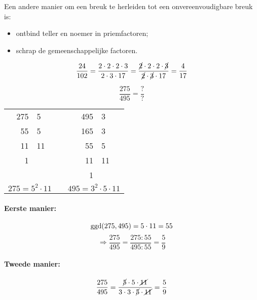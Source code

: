 \documentclass[12pt]{article}
\begin{document}
Een andere manier om een breuk te herleiden tot een onvereenvoudigbare breuk is:
\begin{itemize}
  \item ontbind teller en noemer in priemfactoren;
  \item schrap de gemeenschappelijke factoren.
\end{itemize}

\begin{voorbeeld}
$$\dfrac{24}{102}=\dfrac{2\cdot 2\cdot 2\cdot 3}{2\cdot 3 \cdot 17}=\dfrac{\cancel{2}\cdot 2\cdot 2\cdot \cancel{3}}{\cancel{2}\cdot \cancel{3} \cdot 17}=\dfrac{4}{17}$$
\end{voorbeeld}

\begin{voorbeeld}
$$\dfrac{275}{495}=\dfrac{?}{?}$$

\begin{center}
\begin{tabular}{r|lp{2cm}r|l}
275 & 5 & & 495 & 3\\
55 & 5 & &  165 & 3\\
11 & 11  & &  55 & 5\\
1 &   & &   11 & 11\\
  &   & &    1 &\\
\multicolumn{2}{c}{$275=5^2\cdot 11$}&&\multicolumn{2}{c}{$495=3^2\cdot 5\cdot 11$}
\end{tabular}
\end{center}

\paragraph*{Eerste manier:}
$$\ggd(275, 495)=5  \cdot 11 = 55$$
$$\Rightarrow \dfrac{275}{495}=\dfrac{275:55}{495:55}=\dfrac{5}{9}$$

\paragraph*{Tweede manier:}
$$\dfrac{275}{495}=\dfrac{\cancel{5}\cdot 5\cdot \cancel{11}}{3 \cdot 3 \cdot \cancel{5} \cdot \cancel{11}}=\dfrac{5}{9}$$

\end{voorbeeld}
\end{document}
